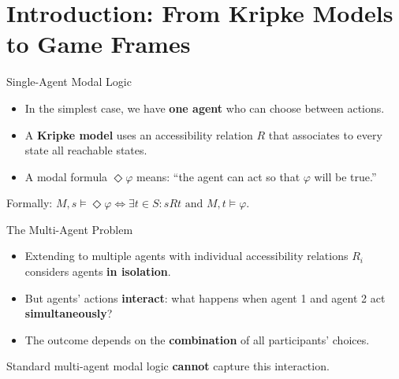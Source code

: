\documentclass[aspectratio=169, 12pt]{beamer}
\begin{document}
\section{Introduction: From Kripke Models to Game Frames}

\begin{frame}{Single-Agent Modal Logic}
	\begin{itemize}
		\item In the simplest case, we have \textbf{one agent} who can choose between actions.
		\item A \textbf{Kripke model} uses an accessibility relation $R$ that associates to every state all reachable states.
		\item A modal formula $\Diamond \varphi$ means: ``the agent can act so that $\varphi$ will be true.''
	\end{itemize}

	\vspace{0.5em}
	Formally: $M, s \models \Diamond \varphi \iff \exists t \in S: sRt \text{ and } M, t \models \varphi$.
\end{frame}


\begin{frame}{The Multi-Agent Problem}
	\begin{itemize}
		\item Extending to multiple agents with individual accessibility relations $R_i$ considers agents \textbf{in isolation}.
		\item But agents' actions \textbf{interact}: what happens when agent 1 and agent 2 act \textbf{simultaneously}?
		\item The outcome depends on the \textbf{combination} of all participants' choices.
	\end{itemize}

	\vspace{0.5em}
	Standard multi-agent modal logic \textbf{cannot} capture this interaction.
\end{frame}
\end{document}
